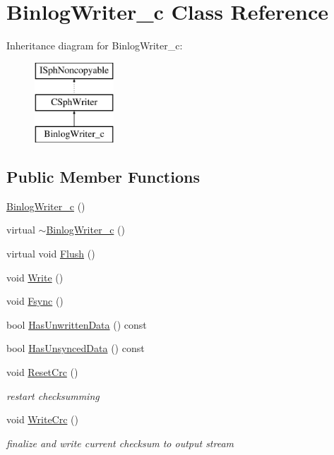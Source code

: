 \hypertarget{classBinlogWriter__c}{\section{Binlog\-Writer\-\_\-c Class Reference}
\label{classBinlogWriter__c}
}
Inheritance diagram for Binlog\-Writer\-\_\-c\-:\begin{figure}[H]
\begin{center}
\leavevmode
\includegraphics[height=3.000000cm]{classBinlogWriter__c}
\end{center}
\end{figure}
\subsection*{Public Member Functions}
\begin{DoxyCompactItemize}
\item 
\hyperlink{classBinlogWriter__c_a8a67c21cbed27a874931599a60d853c1}{Binlog\-Writer\-\_\-c} ()
\item 
virtual \hyperlink{classBinlogWriter__c_aec0069660c8ba9352bce4039824a0212}{$\sim$\-Binlog\-Writer\-\_\-c} ()
\item 
virtual void \hyperlink{classBinlogWriter__c_ac1a668069eb0155b3b9f77bbe0e69d7c}{Flush} ()
\item 
void \hyperlink{classBinlogWriter__c_a8becf80d513b60a3e1f393b1bad8a36f}{Write} ()
\item 
void \hyperlink{classBinlogWriter__c_a396f3838cc7e535d21ab2533cf6d4040}{Fsync} ()
\item 
bool \hyperlink{classBinlogWriter__c_a518beb80e643750c67c8b4632b12ec0b}{Has\-Unwritten\-Data} () const 
\item 
bool \hyperlink{classBinlogWriter__c_a83d14a189759f79c94bd82ccd9588b19}{Has\-Unsynced\-Data} () const 
\item 
void \hyperlink{classBinlogWriter__c_a5bf4c76d82945791b4dfa8db26295551}{Reset\-Crc} ()
\begin{DoxyCompactList}\small\item\em restart checksumming \end{DoxyCompactList}\item 
void \hyperlink{classBinlogWriter__c_a275e0934bb96d4103eb47a0597cf7b95}{Write\-Crc} ()
\begin{DoxyCompactList}\small\item\em finalize and write current checksum to output stream \end{DoxyCompactList}\end{DoxyCompactItemize}
